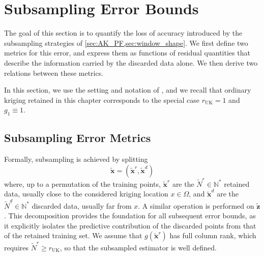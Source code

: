 \section{Subsampling Error Bounds}\label{sec:subsampling_error}

The goal of this section is to quantify the loss of accuracy introduced by the subsampling strategies of \cref{sec:AK_PF,sec:window_shape}. We first define two metrics for this error, and express them as functions of residual quantities that describe the information carried by the discarded data alone. We then derive two relations between these metrics.

In this section, we use the setting and notation of , and we recall that ordinary kriging retained in this chapter corresponds to the special case $r_{\mathrm{UK}}=1$ and $g_1\equiv1$.

\subsection{Subsampling Error Metrics}\label{sec:errors_metrics}

Formally, subsampling is achieved by splitting
\begin{equation}
	\tilde{\mathbf{x}}=\left(\tilde{\mathbf{x}}^r,\tilde{\mathbf{x}}^d\right)\label{eq:subsampling_decomposition}
\end{equation}
where, up to a permutation of the training points, $\tilde{\mathbf{x}}^r$ are the $\tilde{N}^r\in\mathbb{N}^*$ retained data, usually close to the considered kriging location $x\in\Omega$, and $\tilde{\mathbf{x}}^d$ are the $\tilde{N}^d\in\mathbb{N}^*$ discarded data, usually far from $x$. A similar operation is performed on $\tilde{\mathbf{z}}$. This decomposition provides the foundation for all subsequent error bounds, as it explicitly isolates the predictive contribution of the discarded points from that of the retained training set. We assume that $g(\tilde{\mathbf{x}}^r)$ has full column rank, which requires $\tilde{N}^r\geq r_{\mathrm{UK}}$, so that the subsampled estimator is well defined.

